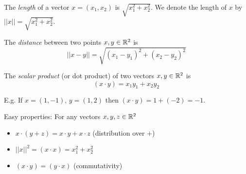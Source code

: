 \documentclass[10pt]{scrartcl}
\begin{document}
\begin{definition}[Distance]
	The \emph{length} of a vector $x = (x_1,x_2)$ is $\sqrt{x_1^2 + x_2^2}$. We denote the length of $x$ by $||x|| = \sqrt{x_1^2 + x_2^2}$. 
	
	The \emph{distance} between two points $x,y\in\mathbb{R}^2$ is 
	\[||x-y|| = \sqrt{(x_1-y_1)^2 + (x_2-y_2)^2}\]
\end{definition}\vsp

\begin{definition}
The \emph{scalar product} (or dot product) of two vectors $x,y\in\mathbb{R}^2$ is 
\[(x\cdot y) = x_1y_1 + x_2y_2\]	
\end{definition}

E.g. If $x = (1,-1),\, y= (1,2)$ then $(x\cdot y) = 1 + (-2) = -1$. 

Easy properties: For any vectors $x,y,z \in\mathbb{R}^2$
\begin{itemize}
\item $x\cdot (y + z) = x\cdot y + x\cdot z$ (distribution over $+$)
\item $||x||^2 = (x\cdot x) = x_1^2 + x_2^2$
\item $(x\cdot y) = (y\cdot x)$ (commutativity)	
\end{itemize}\vsp
\end{document}
